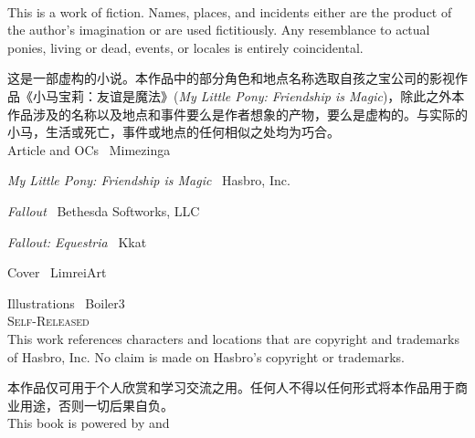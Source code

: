 \newpage

~\vfill

\thispagestyle{empty}

\noindent This is a work of fiction. Names, places, and incidents either are the product of the author's imagination or are used fictitiously. Any resemblance to actual ponies, living or dead, events, or locales is entirely coincidental.

\noindent 这是一部虚构的小说。本作品中的部分角色和地点名称选取自孩之宝公司的影视作品《小马宝莉：友谊是魔法》(\emph{My Little Pony: Friendship is Magic})，除此之外本作品涉及的名称以及地点和事件要么是作者想象的产物，要么是虚构的。与实际的小马，生活或死亡，事件或地点的任何相似之处均为巧合。\\

\noindent Article and OCs \textcopyright\ Mimezinga

\noindent \emph{My Little Pony: Friendship is Magic} \textcopyright\ Hasbro, Inc.

\noindent \emph{Fallout} \textcopyright\ Bethesda Softworks, LLC

\noindent \emph{Fallout: Equestria} \textcopyright\ Kkat

\noindent Cover \textcopyright\ LimreiArt

\noindent Illustrations \textcopyright\ Boiler3 \\

\noindent \textsc{Self-Released}\\

\noindent This work references characters and locations that are copyright and trademarks of Hasbro, Inc. No claim is made on Hasbro's copyright or trademarks.

\noindent 本作品仅可用于个人欣赏和学习交流之用。任何人不得以任何形式将本作品用于商业用途，否则一切后果自负。\\

\noindent This book is powered by \XeLaTeX{} and \CTeX{}


